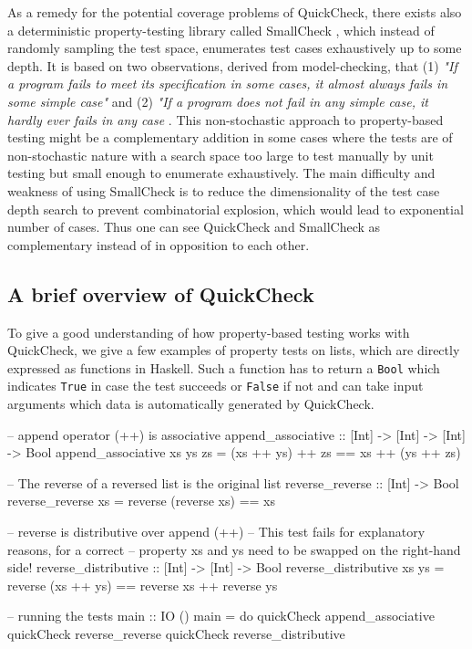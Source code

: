 \medskip

As a remedy for the potential coverage problems of QuickCheck, there exists also a deterministic property-testing library called SmallCheck \cite{runciman_smallcheck_2008}, which instead of randomly sampling the test space, enumerates test cases exhaustively up to some depth. It is based on two observations, derived from model-checking, that (1) \textit{"If a program fails to meet its specification in some cases, it almost always fails in some simple case"} and (2) \textit{"If a program does not fail in any simple case, it hardly ever fails in any case} \cite{runciman_smallcheck_2008}. This non-stochastic approach to property-based testing might be a complementary addition in some cases where the tests are of non-stochastic nature with a search space too large to test manually by unit testing but small enough to enumerate exhaustively. The main difficulty and weakness of using SmallCheck is to reduce the dimensionality of the test case depth search to prevent combinatorial explosion, which would lead to exponential number of cases. Thus one can see QuickCheck and SmallCheck as complementary instead of in opposition to each other.

\subsection{A brief overview of QuickCheck}
To give a good understanding of how property-based testing works with \\ QuickCheck, we give a few examples of property tests on lists, which are directly expressed as functions in Haskell. Such a function has to return a \texttt{Bool} which indicates \texttt{True} in case the test succeeds or \texttt{False} if not and can take input arguments which data is automatically generated by QuickCheck.

\begin{HaskellCode}
-- append operator (++) is associative
append_associative :: [Int] -> [Int] -> [Int] -> Bool
append_associative xs ys zs = (xs ++ ys) ++ zs == xs ++ (ys ++ zs)

-- The reverse of a reversed list is the original list
reverse_reverse :: [Int] -> Bool
reverse_reverse xs = reverse (reverse xs) == xs

-- reverse is distributive over append (++)
-- This test fails for explanatory reasons, for a correct 
-- property xs and ys need to be swapped on the right-hand side!
reverse_distributive :: [Int] -> [Int] -> Bool
reverse_distributive xs ys = reverse (xs ++ ys) == reverse xs ++ reverse ys

-- running the tests
main :: IO ()
main = do
  quickCheck append_associative
  quickCheck reverse_reverse
  quickCheck reverse_distributive
\end{HaskellCode}


